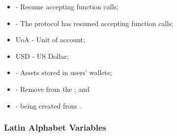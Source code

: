 \documentclass[class=article, crop=false]{standalone}
\begin{document}
\begin{itemize}[topsep=0pt, itemsep=3pt,leftmargin=16pt]
    \item[]  - Resume accepting  function calls;
    \item[]  - The protocol has resumed accepting  function calls;
    \item[] UoA - Unit of account;
    \item[] USD - US Dollar;
    \item[]  - Assets stored in users' wallets;
    \item[]  - Remove from the ; and
    \item[]  -  being created from  \Pinto.
\end{itemize}


\subsubsection{Latin Alphabet Variables}
\end{document}
